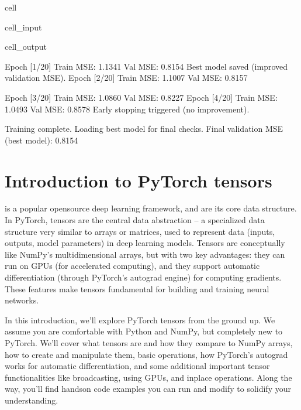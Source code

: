\documentclass[letterpaper,10pt,english]{jupyterBook}
\begin{document}
\begin{sphinxuseclass}{cell}
\begin{sphinxVerbatimInput}
\begin{sphinxuseclass}{cell_input}
\end{sphinxuseclass}\end{sphinxVerbatimInput}
\begin{sphinxVerbatimOutput}

\begin{sphinxuseclass}{cell_output}
\begin{sphinxVerbatim}[commandchars=\\\{\}]
Epoch [1/20]  Train MSE: 1.1341  Val MSE: 0.8154
  Best model saved (improved validation MSE).
Epoch [2/20]  Train MSE: 1.1007  Val MSE: 0.8157
\end{sphinxVerbatim}

\begin{sphinxVerbatim}[commandchars=\\\{\}]
Epoch [3/20]  Train MSE: 1.0860  Val MSE: 0.8227
Epoch [4/20]  Train MSE: 1.0493  Val MSE: 0.8578
Early stopping triggered (no improvement).

Training complete. Loading best model for final checks.
Final validation MSE (best model): 0.8154
\end{sphinxVerbatim}

\end{sphinxuseclass}\end{sphinxVerbatimOutput}

\end{sphinxuseclass}

\section{Introduction to PyTorch tensors}
\label{\detokenize{04:introduction-to-pytorch-tensors}}
\sphinxAtStartPar
{} is a popular open\sphinxhyphen{}source deep learning framework, and  are its core data structure. In PyTorch, tensors are the central data abstraction – a specialized data structure very similar to arrays or matrices, used to represent data (inputs, outputs, model parameters) in deep learning models. Tensors are conceptually like NumPy’s multi\sphinxhyphen{}dimensional arrays, but with two key advantages: they can run on GPUs (for accelerated computing), and they support automatic differentiation (through PyTorch’s autograd engine) for computing gradients. These features make tensors fundamental for building and training neural networks.

\sphinxAtStartPar
In this introduction, we’ll explore PyTorch tensors from the ground up. We assume you are comfortable with Python and NumPy, but completely new to PyTorch. We’ll cover what tensors are and how they compare to NumPy arrays, how to create and manipulate them, basic operations, how PyTorch’s autograd works for automatic differentiation, and some additional important tensor functionalities like broadcasting, using GPUs, and in\sphinxhyphen{}place operations. Along the way, you’ll find hands\sphinxhyphen{}on code examples you can run and modify to solidify your understanding.
\end{document}
